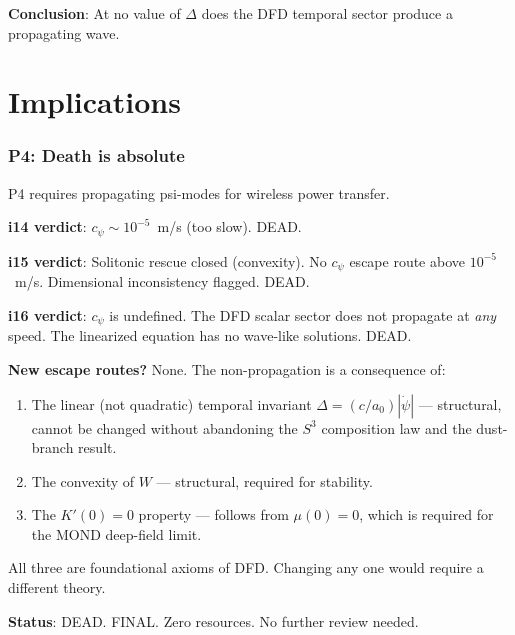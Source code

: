 \documentclass[11pt]{article}
\begin{document}
\textbf{Conclusion}: At no value of $\Delta$ does the DFD temporal sector produce a propagating wave.


\part{Implications}
\label{part:implications}

\section{P4: Death is absolute}

\begin{tcolorbox}[colback=red!5!white, colframe=red!60!black,
  title=\textbf{P4 FINAL DEATH CONFIRMATION}]

P4 requires propagating psi-modes for wireless power transfer.

\textbf{i14 verdict}: $c_\psi \sim 10^{-5}$~m/s (too slow). DEAD.

\textbf{i15 verdict}: Solitonic rescue closed (convexity). No $c_\psi$ escape route above $10^{-5}$~m/s. Dimensional inconsistency flagged. DEAD.

\textbf{i16 verdict}: $c_\psi$ is undefined. The DFD scalar sector does not propagate at \emph{any} speed. The linearized equation has no wave-like solutions. DEAD.

\textbf{New escape routes?} None. The non-propagation is a consequence of:
\begin{enumerate}[nosep]
\item The linear (not quadratic) temporal invariant $\Delta = (c/a_0)|\dot\psi|$ --- structural, cannot be changed without abandoning the $S^3$ composition law and the dust-branch result.
\item The convexity of $W$ --- structural, required for stability.
\item The $K'(0) = 0$ property --- follows from $\mu(0) = 0$, which is required for the MOND deep-field limit.
\end{enumerate}

All three are foundational axioms of DFD. Changing any one would require a different theory.

\textbf{Status}: DEAD. FINAL. Zero resources. No further review needed.
\end{tcolorbox}
\end{document}
